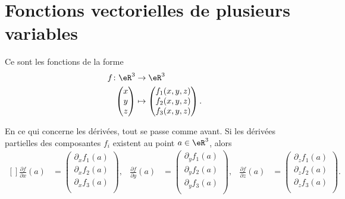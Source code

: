 \section{Fonctions vectorielles de plusieurs variables}

Ce sont les fonctions de la forme
\begin{equation}
    \begin{aligned}
        f\colon \eR^3&\to \eR^3 \\
        \begin{pmatrix}
            x    \\
            y    \\
            z
        \end{pmatrix}&\mapsto \begin{pmatrix}
            f_1(x,y,z)\\
            f_2(x,y,z)\\
            f_3(x,y,z)
        \end{pmatrix}.
    \end{aligned}
\end{equation}

En ce qui concerne les dérivées, tout se passe comme avant. Si les dérivées partielles des composantes $f_i$ existent au point $a\in\eR^3$, alors
\begin{equation}
    \begin{aligned}[]
        \frac{ \partial f }{ \partial x }(a)&=\begin{pmatrix}
            \partial_xf_1(a)    \\
            \partial_xf_2(a)    \\
            \partial_xf_3(a)    \\
        \end{pmatrix},&
        \frac{ \partial f }{ \partial y }(a)&=\begin{pmatrix}
            \partial_yf_1(a)    \\
            \partial_yf_2(a)    \\
            \partial_yf_3(a)    \\
        \end{pmatrix},&
        \frac{ \partial f }{ \partial z }(a)&=\begin{pmatrix}
            \partial_zf_1(a)    \\
            \partial_zf_2(a)    \\
            \partial_zf_3(a)    \\
        \end{pmatrix}.
    \end{aligned}
\end{equation}

